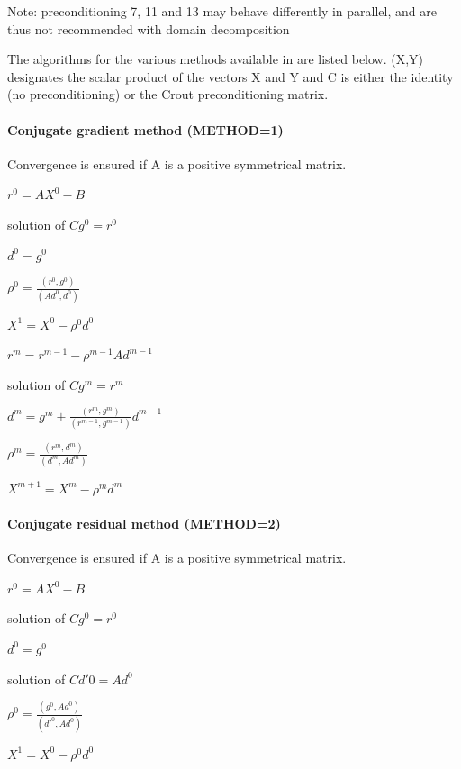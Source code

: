 Note: preconditioning 7, 11 and 13 may behave differently in parallel, and are
thus not recommended with domain decomposition

The algorithms for the various methods available in \bief are listed below.
(X,Y) designates the scalar product of the vectors X and Y and C is either the
identity (no preconditioning) or the Crout preconditioning matrix.

\paragraph{Conjugate gradient method (METHOD=1)}

Convergence is ensured if A is a positive symmetrical matrix.


$r^{0}  =  A X^{0} - B$

solution of $Cg^{0}  =  r^{0}$

$d^{0} = g^{0}$

$\rho ^{0} = \frac{(r^{0},g^{0})}{(Ad^{0},d^{0})}$

$X^{1}  =  X^{0}  -  \rho ^{0} d^{0}$


$r^{m}  =  r^{m-1}  -  \rho ^{m-1} A d^{m-1}$

solution of $Cg^{m}  =  r^{m}$

$d^{m} = g^{m} + \frac{(r^{m},g^{m})}{(r^{m-1},g^{m-1})} d^{m-1}$

$\rho ^{m} = \frac{(r^{m},d^{m})}{(d^{m},Ad^{m})}$

$X^{m+1}  =  X^{m}  -  \rho ^{m} d^{m}$

\paragraph{Conjugate residual method (METHOD=2)}

Convergence is ensured if A is a positive symmetrical matrix.


$r^{0}  =  A X^{0} - B$

solution of $Cg^{0}  =  r^{0}$

$d^{0}  =  g^{0}$

solution of $Cd'0  =  Ad^{0}$

$\rho ^{0} = \frac{(g^{0},Ad^{0})}{(d'^{0},Ad^{0})}$

$X^{1}  =  X^{0}  -  \rho ^{0} d^{0}$

